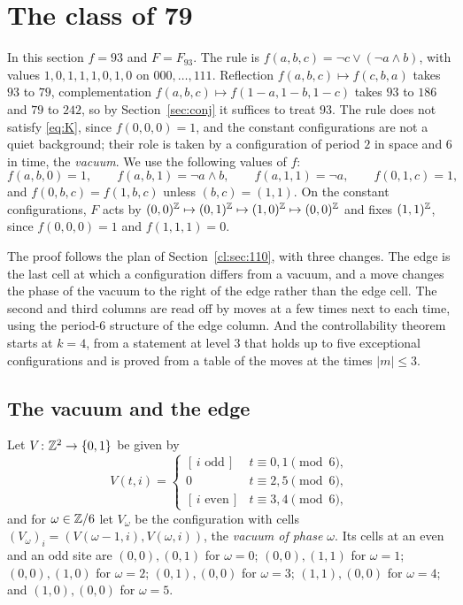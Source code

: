 \section{The class of 79}\label{sec:79}

In this section $f=93$ and $F=F_{93}$. The rule is $f(a,b,c)=\neg c\vee(\neg a\wedge b)$, with values $1,0,1,1,1,0,1,0$ on $000,\dots,111$. Reflection $f(a,b,c)\mapsto f(c,b,a)$ takes $93$ to $79$, complementation $f(a,b,c)\mapsto f(1-a,1-b,1-c)$ takes $93$ to $186$ and $79$ to $242$, so by Section~\ref{sec:conj} it suffices to treat $93$. The rule does not satisfy \eqref{eq:K}, since $f(0,0,0)=1$, and the constant configurations are not a quiet background; their role is taken by a configuration of period $2$ in space and $6$ in time, the \emph{vacuum}. We use the following values of $f$:
\begin{equation}\label{c79:eq:f}
f(a,b,0)=1,\qquad f(a,b,1)=\neg a\wedge b,\qquad f(a,1,1)=\neg a,\qquad f(0,1,c)=1,
\end{equation}
and $f(0,b,c)=f(1,b,c)$ unless $(b,c)=(1,1)$. On the constant configurations, $F$ acts by $(0,0)^{\mathbb{Z}}\mapsto(0,1)^{\mathbb{Z}}\mapsto(1,0)^{\mathbb{Z}}\mapsto(0,0)^{\mathbb{Z}}$ and fixes $(1,1)^{\mathbb{Z}}$, since $f(0,0,0)=1$ and $f(1,1,1)=0$.

The proof follows the plan of Section~\ref{cl:sec:110}, with three changes. The edge is the last cell at which a configuration differs from a vacuum, and a move changes the phase of the vacuum to the right of the edge rather than the edge cell. The second and third columns are read off by moves at a few times next to each time, using the period-$6$ structure of the edge column. And the controllability theorem starts at $k=4$, from a statement at level $3$ that holds up to five exceptional configurations and is proved from a table of the moves at the times $|m|\le3$.

\subsection{The vacuum and the edge}\label{c79:sec:setup}

Let $V\colon\mathbb{Z}^2\to\{0,1\}$ be given by
\[
V(t,i)=\begin{cases}[\,i\text{ odd}\,]&t\equiv0,1\pmod 6,\\ 0&t\equiv2,5\pmod 6,\\ [\,i\text{ even}\,]&t\equiv3,4\pmod 6,\end{cases}
\]
and for $\omega\in\mathbb{Z}/6$ let $V_\omega$ be the configuration with cells $(V_\omega)_i=(V(\omega-1,i),V(\omega,i))$, the \emph{vacuum of phase $\omega$}. Its cells at an even and an odd site are $(0,0),(0,1)$ for $\omega=0$; $(0,0),(1,1)$ for $\omega=1$; $(0,0),(1,0)$ for $\omega=2$; $(0,1),(0,0)$ for $\omega=3$; $(1,1),(0,0)$ for $\omega=4$; and $(1,0),(0,0)$ for $\omega=5$.

